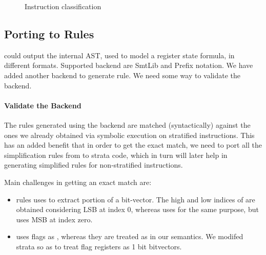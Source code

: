 \begin{figure*}[t]
\centering
{}
\caption{Instruction classification\label{fig:instr_class}}
\end{figure*}

\subsection{Porting to \K Rules}

\Strata could output the internal AST, used to model a register state formula, in different
formats. Supported backend are SmtLib and Prefix notation. We have added another backend 
to generate \K rule. We need some way to validate the backend. 

\paragraph{Validate the Backend}

The \K rules generated using the backend are matched (syntactically)  against
the ones we already obtained via symbolic execution on stratified instructions.
This has an added benefit that in order to get the exact match, we need to port
all the simplification rules from \K to strata code, which in turn will later
help in generating simplified \K rules for non-stratified instructions. 

Main challenges in getting an exact match are:
\begin{itemize}

\item  \Strata rules uses \extract to extract portion of a bit-vector. The high
and low indices of \extract are obtained considering LSB at index 0, whereas \K
uses \extractMInt for the same purpose, but uses MSB at index zero.

\item  \Strata uses flags as \bool, whereas they are treated as \bv in our
semantics. We modifed strata so as to treat flag registers as 1 bit bitvectors.

\end{itemize}


